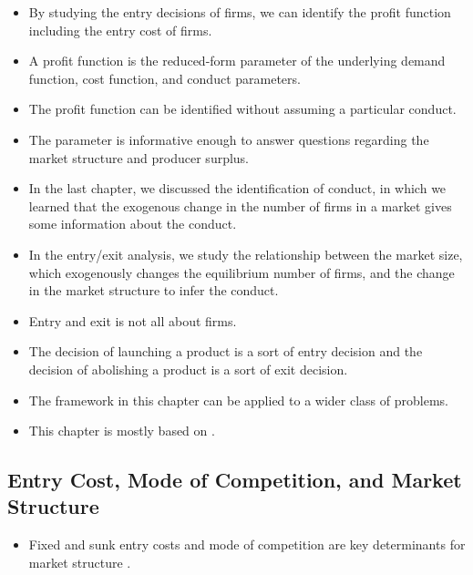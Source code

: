 \documentclass[]{book}
\providecommand{\tightlist}{%
  \setlength{\itemsep}{0pt}\setlength{\parskip}{0pt}}
\begin{document}
\begin{itemize}
\tightlist
\item
  By studying the entry decisions of firms, we can identify the profit
  function including the entry cost of firms.
\item
  A profit function is the reduced-form parameter of the underlying
  demand function, cost function, and conduct parameters.
\item
  The profit function can be identified without assuming a particular
  conduct.
\item
  The parameter is informative enough to answer questions regarding the
  market structure and producer surplus.
\item
  In the last chapter, we discussed the identification of conduct, in
  which we learned that the exogenous change in the number of firms in a
  market gives some information about the conduct.
\item
  In the entry/exit analysis, we study the relationship between the
  market size, which exogenously changes the equilibrium number of
  firms, and the change in the market structure to infer the conduct.
\item
  Entry and exit is not all about firms.
\item
  The decision of launching a product is a sort of entry decision and
  the decision of abolishing a product is a sort of exit decision.
\item
  The framework in this chapter can be applied to a wider class of
  problems.
\item
  This chapter is mostly based on
  \citet{berryIdentificationModelsOligopoly2006}.
\end{itemize}

\subsection{Entry Cost, Mode of Competition, and Market
Structure}\label{entry-cost-mode-of-competition-and-market-structure}

\begin{itemize}
\tightlist
\item
  Fixed and sunk entry costs and mode of competition are key
  determinants for market structure \citep{suttonChapter35Market2007}.
\end{itemize}
\end{document}
